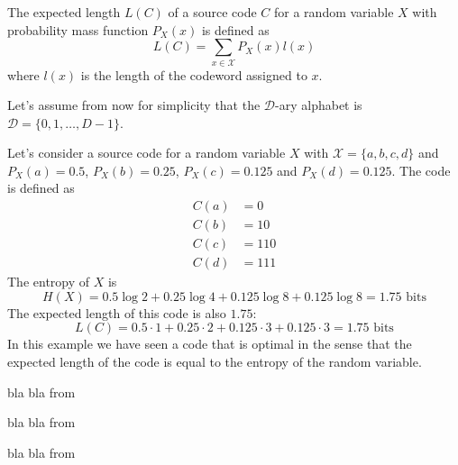 \begin{definition}\label{def:expected_length}
    The expected length $L(C)$ of a source code $C$ for a random variable $X$ with probability mass function $P_X(x)$ is defined as
    \begin{equation}
        L(C) = \sum_{x\in\mathcal{X}} P_X(x)l(x)
    \end{equation}
    where $l(x)$ is the length of the codeword assigned to $x$.
\end{definition}
Let's assume from now for simplicity that the $\mathcal{D}$-ary alphabet is $\mathcal{D} = \{0, 1, \ldots, D-1\}$.

\begin{example}
    Let's consider a source code for a random variable $X$ with $\mathcal{X} = \{a, b, c, d\}$ and $P_X(a) = 0.5$, $P_X(b) = 0.25$, $P_X(c) = 0.125$ and $P_X(d) = 0.125$. The code is defined as
    \begin{align*}
        C(a) &= 0 \\
        C(b) &= 10 \\
        C(c) &= 110 \\
        C(d) &= 111
    \end{align*}
    The entropy of $X$ is
    \begin{equation*}
        H(X) = 0.5\log 2 + 0.25\log 4 + 0.125\log 8 + 0.125\log 8 = 1.75 \text{ bits}
    \end{equation*}
    The expected length of this code is also $1.75$:
    \begin{equation*}
        L(C) = 0.5 \cdot 1 + 0.25 \cdot 2 + 0.125 \cdot 3 + 0.125 \cdot 3 = 1.75 \text{ bits}
    \end{equation*}
    In this example we have seen a code that is optimal in the sense that the expected length of the code is equal to the entropy of the random variable.
\end{example}

\begin{example}\label{ex:morse_code}
    bla bla from \cite{ElementsofInformationTheory}
\end{example}

\begin{definition}\label{def:nonsingular_code}
    bla bla from \cite{ElementsofInformationTheory}
\end{definition}

\begin{definition}\label{def:extension_code}
    bla bla from \cite{ElementsofInformationTheory}
\end{definition}

